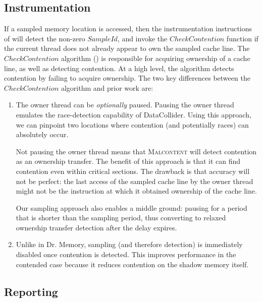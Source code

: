 \documentclass[letterpaper,twocolumn,10pt]{article}
\newcommand{\TextToolname}{Malcontent}
\newcommand{\Toolname}{\textsc{\TextToolname{}}}
\begin{document}
\subsection{Instrumentation}
If a sampled memory location is accessed, then the instrumentation instructions of  will detect the non-zero
$SampleId$, and invoke the $CheckContention$ function if the current thread does not already appear to own the sampled cache line.
The $CheckContention$ algorithm () is responsible for acquiring ownership of a cache line, as well as detecting
contention. At a high level, the algorithm detects contention by failing to acquire ownership. The two key differences between the
$CheckContention$ algorithm and prior work are: \begin{enumerate}
	\item The owner thread can be \emph{optionally} paused. Pausing the owner thread emulates the race-detection capability of
DataCollider. Using this approach, we can pinpoint two locations where contention (and potentially races) can
absolutely occur.

Not pausing the owner thread means that \Toolname{} will detect contention as an ownership transfer. The benefit of
this approach is that it can find contention even within critical sections. The drawback is that accuracy will not be perfect: the last access of
the sampled cache line by the owner thread might not be the instruction at which it obtained ownership of the cache line.

Our sampling approach also enables a middle ground: pausing for a period that is shorter than the sampling period, thus converting
to relaxed ownership transfer detection after the delay expires.

	\item Unlike in Dr. Memory, sampling (and therefore detection) is immediately disabled once contention is detected. This improves
performance in the contended case because it reduces contention on the shadow memory itself.
\end{enumerate}

\subsection{Reporting}

\end{document}
